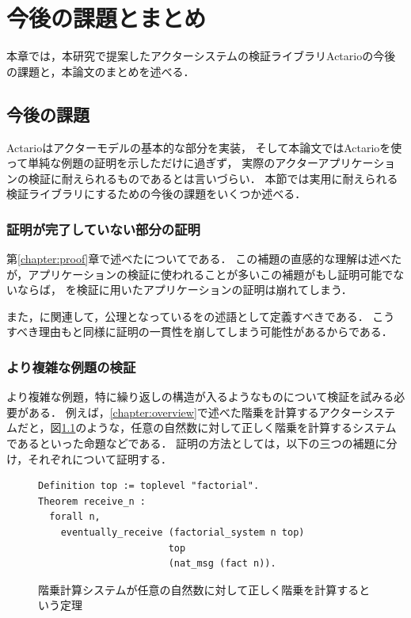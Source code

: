 \chapter{今後の課題とまとめ}
\label{chapter:conclusion}

本章では，本研究で提案したアクターシステムの検証ライブラリActarioの今後の課題と，本論文のまとめを述べる．

\section{今後の課題}

Actarioはアクターモデルの基本的な部分を実装，
そして本論文ではActarioを使って単純な例題の証明を示しただけに過ぎず，
実際のアクターアプリケーションの検証に耐えられるものであるとは言いづらい．
本節では実用に耐えられる検証ライブラリにするための今後の課題をいくつか述べる．

\subsection{証明が完了していない部分の証明}
第\ref{chapter:proof}章で述べたについてである．
この補題の直感的な理解は述べたが，アプリケーションの検証に使われることが多いこの補題がもし証明可能でないならば，
を検証に用いたアプリケーションの証明は崩れてしまう．

また，に関連して，公理となっているをの述語として定義すべきである．
こうすべき理由もと同様に証明の一貫性を崩してしまう可能性があるからである．

\subsection{より複雑な例題の検証}
より複雑な例題，特に繰り返しの構造が入るようなものについて検証を試みる必要がある．
例えば，\ref{chapter:overview}で述べた階乗を計算するアクターシステムだと，図\ref{code:conclusion:fact-n}のような，任意の自然数に対して正しく階乗を計算するシステムであるといった命題などである．
証明の方法としては，以下の三つの補題に分け，それぞれについて証明する．

\begin{figure}[tp]
\begin{lstlisting}
Definition top := toplevel "factorial".
Theorem receive_n :
  forall n,
    eventually_receive (factorial_system n top)
                       top
                       (nat_msg (fact n)).
\end{lstlisting}
  \label{code:conclusion:fact-n}
  \caption{階乗計算システムが任意の自然数に対して正しく階乗を計算するという定理}
\end{figure}


